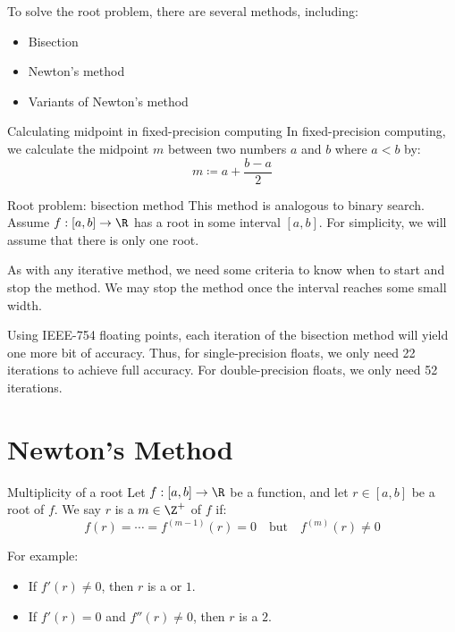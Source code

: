 To solve the root problem, there are several methods, including:
\begin{itemize}
    \item Bisection
    \item Newton's method
    \item Variants of Newton's method
\end{itemize}


\begin{tecbox}{Calculating midpoint in fixed-precision computing}{}
    In fixed-precision computing, we calculate the midpoint $m$ between two numbers $a$ and $b$ where $a < b$ by:
    \[ m \coloneq a + \frac{b - a}{2} \]
\end{tecbox}


\begin{tecbox}{Root problem: bisection method}{}
    This method is analogous to binary search. Assume $f : [a,b] \to \R$ has a root in some interval $[a,b]$. For simplicity, we will assume that there is only one root.


\end{tecbox}

As with any iterative method, we need some criteria to know when to start and stop the method. We may stop the method once the interval reaches some small width.

Using IEEE-754 floating points, each iteration of the bisection method will yield one more bit of accuracy. Thus, for single-precision floats, we only need 22 iterations to achieve full accuracy. For double-precision floats, we only need 52 iterations.

\section{Newton's Method}


\begin{dfnbox}{Multiplicity of a root}{}
    Let $f : [a,b] \to \R$ be a function, and let $r \in [a,b]$ be a root of $f$. We say $r$ is a  $m \in \Z^+$ of $f$ if:
    \[ f(r) = \cdots = f^{(m-1)}(r) = 0 \quad \text{but} \quad f^{(m)}(r) \neq 0 \]
\end{dfnbox}

For example:
\begin{itemize}
    \item If $f\prime(r) \neq 0$, then $r$ is a  or  $1$.
    \item If $f\prime(r) = 0$ and $f \dprime(r) \neq 0$, then $r$ is a  $2$.
\end{itemize}

